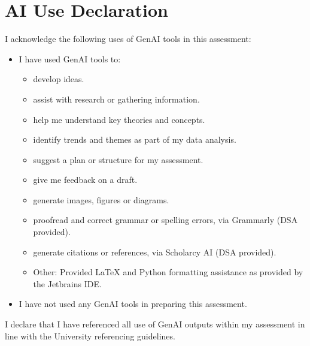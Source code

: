 \section*{AI Use Declaration}

I acknowledge the following uses of GenAI tools in this assessment:

\begin{itemize}
  \item[X] I have used GenAI tools to:
  \begin{itemize}
    \item[-] develop ideas.
    \item[-] assist with research or gathering information.
    \item[-] help me understand key theories and concepts.
    \item[-] identify trends and themes as part of my data analysis.
    \item[-] suggest a plan or structure for my assessment.
    \item[X] give me feedback on a draft.
    \item[-] generate images, figures or diagrams.
    \item[X] proofread and correct grammar or spelling errors, via Grammarly (DSA provided).
    \item[X] generate citations or references, via Scholarcy AI (DSA provided).
    \item[X] Other: Provided LaTeX and Python formatting assistance as provided by the Jetbrains IDE.
  \end{itemize}
  \item[-] I have not used any GenAI tools in preparing this assessment.
\end{itemize}

\noindent I declare that I have referenced all use of GenAI outputs within my assessment in line with the University referencing guidelines.